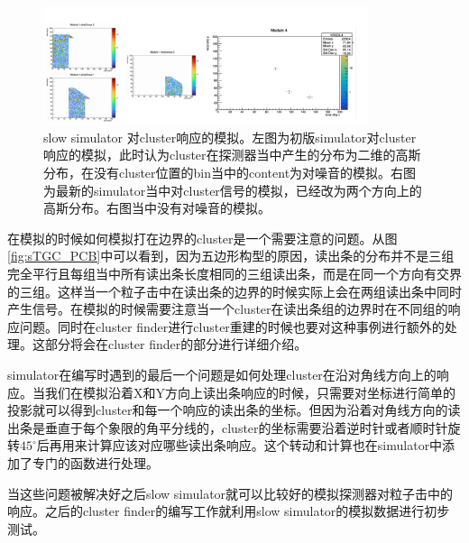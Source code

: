 \begin{figure}[htb]
    \begin{center}
    \includegraphics[width=0.85\textwidth,clip]{figures/Chapter3/Simulator_Cluster.png}
    \end{center}
    \caption[slow simulator 对cluster响应的模拟]{slow simulator 对cluster响应的模拟。左图为初版simulator对cluster响应的模拟，此时认为cluster在探测器当中产生的分布为二维的高斯分布，在没有cluster位置的bin当中的content为对噪音的模拟。右图为最新的simulator当中对cluster信号的模拟，已经改为两个方向上的高斯分布。右图当中没有对噪音的模拟。}
    \label{fig:Simulator_Cluster}
\end{figure}

在模拟的时候如何模拟打在边界的cluster是一个需要注意的问题。从图\ref{fig:sTGC_PCB}中可以看到，因为五边形构型的原因，读出条的分布并不是三组完全平行且每组当中所有读出条长度相同的三组读出条，而是在同一个方向有交界的三组。这样当一个粒子击中在读出条的边界的时候实际上会在两组读出条中同时产生信号。在模拟的时候需要注意当一个cluster在读出条组的边界时在不同组的响应问题。同时在cluster finder进行cluster重建的时候也要对这种事例进行额外的处理。这部分将会在cluster finder的部分进行详细介绍。

simulator在编写时遇到的最后一个问题是如何处理cluster在沿对角线方向上的响应。当我们在模拟沿着X和Y方向上读出条响应的时候，只需要对坐标进行简单的投影就可以得到cluster和每一个响应的读出条的坐标。但因为沿着对角线方向的读出条是垂直于每个象限的角平分线的，cluster的坐标需要沿着逆时针或者顺时针旋转$45^{\circ}$后再用来计算应该对应哪些读出条响应。这个转动和计算也在simulator中添加了专门的函数进行处理。

当这些问题被解决好之后slow simulator就可以比较好的模拟探测器对粒子击中的响应。之后的cluster finder的编写工作就利用slow simulator的模拟数据进行初步测试。